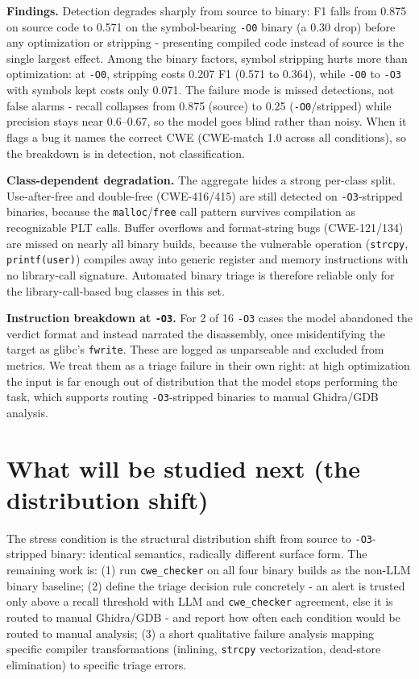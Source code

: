 \documentclass[10pt]{article}
\begin{document}
\textbf{Findings.} Detection degrades sharply from source to binary: F1 falls
from 0.875 on source code to 0.571 on the symbol-bearing \texttt{-O0} binary (a
0.30 drop) before any optimization or stripping - presenting
compiled code instead of source is the single largest effect. Among the binary
factors, symbol stripping hurts more than optimization: at \texttt{-O0},
stripping costs 0.207 F1 (0.571 to 0.364), while \texttt{-O0} to \texttt{-O3}
with symbols kept costs only 0.071. The failure mode is missed detections, not
false alarms - recall collapses from 0.875 (source) to 0.25
(\texttt{-O0}/stripped) while precision stays near 0.6--0.67, so the model goes
blind rather than noisy. When it flags a bug it names the correct CWE
(CWE-match 1.0 across all conditions), so the breakdown is in detection,
not classification.

\textbf{Class-dependent degradation.} The aggregate hides a strong per-class
split. Use-after-free and double-free (CWE-416/415) are still detected on
\texttt{-O3}-stripped binaries, because the \texttt{malloc}/\texttt{free} call
pattern survives compilation as recognizable PLT calls. Buffer overflows and
format-string bugs (CWE-121/134) are missed on nearly all binary builds, because
the vulnerable operation (\texttt{strcpy}, \texttt{printf(user)}) compiles away
into generic register and memory instructions with no library-call signature.
Automated binary triage is therefore reliable only for the library-call-based
bug classes in this set.

\textbf{Instruction breakdown at \texttt{-O3}.} For 2 of 16 \texttt{-O3} cases
the model abandoned the verdict format and instead narrated the
disassembly, once misidentifying the target as glibc's \texttt{fwrite}. These are
logged as unparseable and excluded from metrics. We treat them as a triage
failure in their own right: at high optimization the input is far enough out of
distribution that the model stops performing the task, which supports routing
\texttt{-O3}-stripped binaries to manual Ghidra/GDB analysis.

\section{What will be studied next (the distribution shift)}
The stress condition is the structural distribution shift from source to
\texttt{-O3}-stripped binary: identical semantics, radically different surface
form. The remaining work is: (1) run \texttt{cwe\_checker} on all four binary
builds as the non-LLM binary baseline; (2) define the triage decision rule
concretely - an alert is trusted only above a recall threshold with LLM and
\texttt{cwe\_checker} agreement, else it is routed to manual Ghidra/GDB - and
report how often each condition would be routed to manual analysis; (3) a short
qualitative failure analysis mapping specific compiler transformations (inlining,
\texttt{strcpy} vectorization, dead-store elimination) to specific triage errors.
\end{document}
